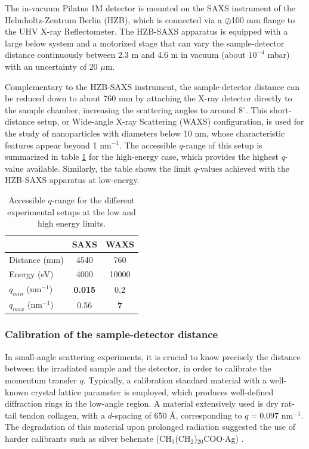 The in-vacuum Pilatus 1M detector is mounted on the SAXS instrument of the Helmholtz-Zentrum Berlin (HZB), which is connected via a $\oslash$100 mm flange to the UHV X-ray Reflectometer. The HZB-SAXS apparatus is equipped with a large below system and a motorized stage that can vary the sample-detector distance continuously between 2.3 m and 4.6 m in vacuum (about $10^{-4}$ mbar) with an uncertainty of 20 $\mu$m. 

Complementary to the HZB-SAXS instrument, the sample-detector distance can be reduced down to about 760 mm by attaching the X-ray detector directly to the sample chamber, increasing the scattering angles to around $8^{\circ}$. This short-distance setup, or Wide-angle X-ray Scattering (WAXS) configuration, is used for the study of nanoparticles with diameters below 10 nm, whose characteristic features appear beyond 1 nm$^{-1}$. The accessible $q$-range of this setup is summarized in table \ref{tab:qrange} for the high-energy case, which provides the highest $q$-value available. Similarly, the table shows the limit $q$-values achieved with the HZB-SAXS apparatus at low-energy.

\begin{table}[]
\centering
\caption{Accessible $q$-range for the different experimental setups at the low and high energy limits.}
\label{tab:qrange}
\begin{tabular}{|l|c|c|}
\hline
              & \textbf{SAXS} & \textbf{WAXS} \\ \hline
Distance (mm) & 4540          & 760           \\ \hline
Energy (eV)   & 4000          & 10000         \\ \hline
$q_{min}$ (nm$^{-1}$)   & \textbf{0.015}         & 0.2          \\ \hline
$q_{max}$ (nm$^{-1}$)   & 0.56             & \textbf{7}             \\ \hline
\end{tabular}
\end{table}

\subsubsection{Calibration of the sample-detector distance}

In small-angle scattering experiments, it is crucial to know precisely the distance between the irradiated sample and the detector, in order to calibrate the momentum transfer $q$. Typically, a calibration standard material with a well-known crystal lattice parameter is employed, which produces well-defined diffraction rings in the low-angle region. A material extensively used is dry rat-tail tendon collagen, with a $d$-spacing of 650 \AA \citep{amenitsch_performance_1997}, corresponding to $q=0.097$ nm$^{-1}$. The degradation of this material upon prolonged radiation suggested the use of harder calibrants such as silver behenate (CH$_3$(CH$_2$)$_{20}$COO$\cdot$Ag) \citep{huang_x-ray_1993}.

